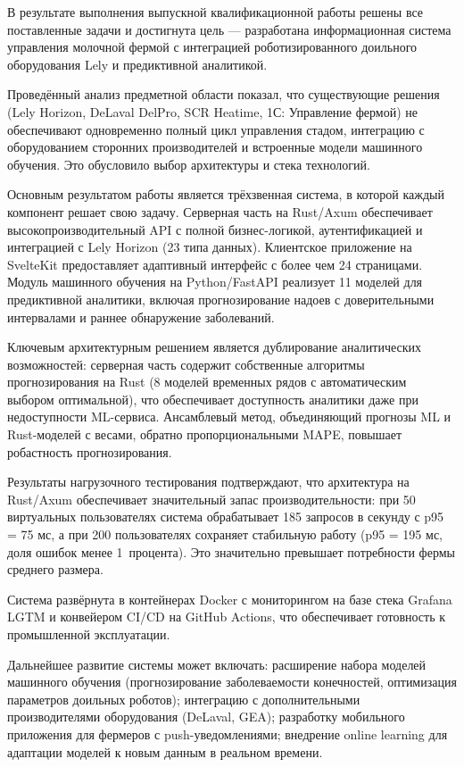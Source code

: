 \conclusion

В результате выполнения выпускной квалификационной работы решены все поставленные задачи и достигнута цель --- разработана информационная система управления молочной фермой с интеграцией роботизированного доильного оборудования Lely и предиктивной аналитикой.

Проведённый анализ предметной области показал, что существующие решения (Lely Horizon, DeLaval DelPro, SCR Heatime, 1С: Управление фермой) не обеспечивают одновременно полный цикл управления стадом, интеграцию с оборудованием сторонних производителей и встроенные модели машинного обучения. Это обусловило выбор архитектуры и стека технологий.

Основным результатом работы является трёхзвенная система, в которой каждый компонент решает свою задачу. Серверная часть на Rust/Axum обеспечивает высокопроизводительный API с полной бизнес-логикой, аутентификацией и интеграцией с Lely Horizon (23 типа данных). Клиентское приложение на SvelteKit предоставляет адаптивный интерфейс с более чем 24 страницами. Модуль машинного обучения на Python/FastAPI реализует 11 моделей для предиктивной аналитики, включая прогнозирование надоев с доверительными интервалами и раннее обнаружение заболеваний.

Ключевым архитектурным решением является дублирование аналитических возможностей: серверная часть содержит собственные алгоритмы прогнозирования на Rust (8 моделей временных рядов с автоматическим выбором оптимальной), что обеспечивает доступность аналитики даже при недоступности ML-сервиса. Ансамблевый метод, объединяющий прогнозы ML и Rust-моделей с весами, обратно пропорциональными MAPE, повышает робастность прогнозирования.

Результаты нагрузочного тестирования подтверждают, что архитектура на Rust/Axum обеспечивает значительный запас производительности: при 50 виртуальных пользователях система обрабатывает 185 запросов в секунду с p95 = 75 мс, а при 200 пользователях сохраняет стабильную работу (p95 = 195 мс, доля ошибок менее 1~процента). Это значительно превышает потребности фермы среднего размера.

Система развёрнута в контейнерах Docker с мониторингом на базе стека Grafana LGTM и конвейером CI/CD на GitHub Actions, что обеспечивает готовность к промышленной эксплуатации.

Дальнейшее развитие системы может включать: расширение набора моделей машинного обучения (прогнозирование заболеваемости конечностей, оптимизация параметров доильных роботов); интеграцию с дополнительными производителями оборудования (DeLaval, GEA); разработку мобильного приложения для фермеров с push-уведомлениями; внедрение online learning для адаптации моделей к новым данным в реальном времени.
